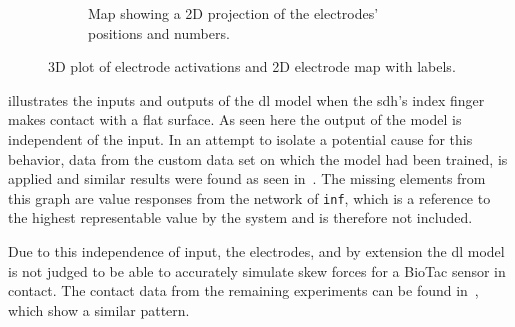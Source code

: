 \begin{figure}[!h]
\begin{subfigure}[b]{0.48\textwidth}
		\caption{Map showing a 2D projection of the electrodes' positions and numbers.}
		\label{fig:electrode-map}
	\end{subfigure}
		\caption{3D plot of electrode activations and 2D electrode map with labels.}
		\label{fig:flat-contact-experimental-and-electrode-map}
\end{figure}

 illustrates the inputs and outputs of the \gls{dl} model when the \gls{sdh}'s index finger makes contact with a flat surface. As seen here the output of the model is independent of the input. In an attempt to isolate a potential cause for this behavior, data from the custom data set on which the model had been trained, is applied and similar results were found as seen in~. The missing elements from this graph are value responses from the network of \texttt{inf}, which is a reference to the highest representable value by the system and is therefore not included. \medskip

Due to this independence of input, the electrodes, and by extension the \gls{dl} model is not judged to be able to accurately simulate skew forces for a BioTac sensor in contact. The contact data from the remaining experiments can be found in~, which show a similar pattern.

